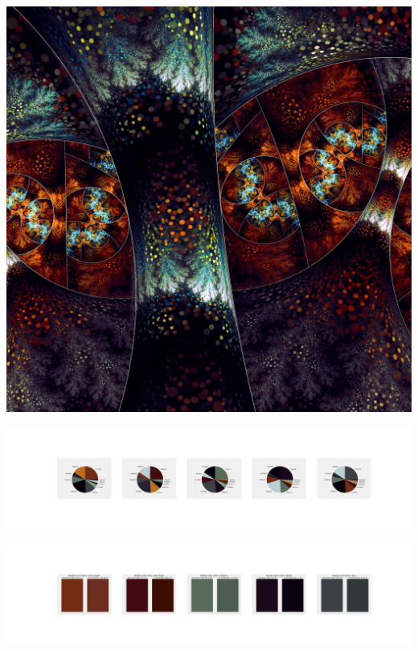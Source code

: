 \documentclass[11pt]{article}
\begin{document}
\begin{landscape}
    \begin{center}
    \includegraphics[width=\textwidth]{./nbimg/file (347).jpg}
    \end{center}

    \begin{center}
    \includegraphics[width=250mm]{./nbimg/pie-275.jpg}
    \end{center}

    \begin{center}
    \includegraphics[width=250mm]{./nbimg/peak-275.jpg}
    \end{center}
    


\end{landscape}
\end{document}
